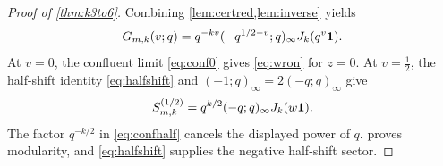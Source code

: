 \begin{proof}[Proof of \cref{thm:k3to6}]
Combining \cref{lem:certred,lem:inverse} yields
\[
G_{m,k}(v;q)=q^{-kv}(-q^{1/2-v};q)_\infty J_k(q^v\mathbf{1}).
\]
At $v=0$, the confluent limit \eqref{eq:conf0} gives \eqref{eq:wron} for $z=0$. At $v=\frac12$, the half-shift identity \eqref{eq:halfshift} and $(-1;q)_\infty=2(-q;q)_\infty$ give
\[
S^{(1/2)}_{m,k}=q^{k/2}(-q;q)_\infty J_k(w\mathbf{1}).
\]
The factor $q^{-k/2}$ in \eqref{eq:confhalf} cancels the displayed power of $q$.  proves modularity, and \eqref{eq:halfshift} supplies the negative half-shift sector.
\end{proof}
